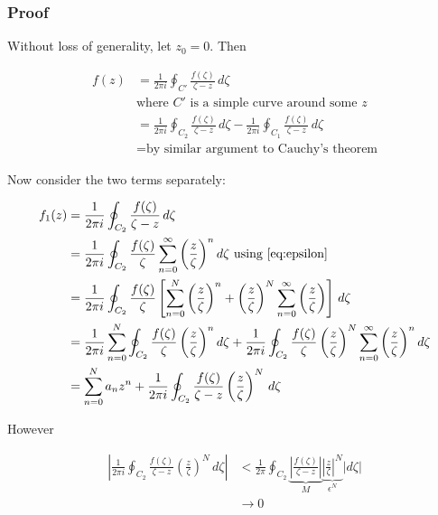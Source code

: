 \documentclass{../../physics_notes}
\begin{document}
\subsubsection*{Proof}

Without loss of generality, let $z_0 = 0$. Then

\begin{align*}
f(z) &= \frac{1}{2\pi i} \oint_{C'} \frac{f(\zeta)}{\zeta - z}\, d\zeta \\
&\text{where $C'$ is a simple curve around some $z$} \\
&= \frac{1}{2\pi i} \oint_{C_2} \frac{f(\zeta)}{\zeta - z}\, d\zeta - \frac{1}{2\pi i} \oint_{C_1} \frac{f(\zeta)}{\zeta - z}\, d\zeta \\
&=\text{by similar argument to Cauchy's theorem}
\end{align*}

Now consider the two terms separately:

\begin{align*}
f_1 (z) &= \frac{1}{2\pi i} \oint_{C_2} \frac{f(\zeta)}{\zeta - z}\, d\zeta \\
&= \frac{1}{2\pi i} \oint_{C_2} \frac{f(\zeta)}{\zeta} \sum_{n=0}^\infty \left(\frac{z}{\zeta}\right)^n d\zeta \text{ using \ref{eq:epsilon}}\\
&= \frac{1}{2\pi i} \oint_{C_2} \frac{f(\zeta)}{\zeta} \left[ \sum_{n=0}^N \left(\frac{z}{\zeta}\right)^n + \left(\frac{z}{\zeta}\right)^N \sum_{n=0}^\infty \left(\frac{z}{\zeta}\right) \right] \, d\zeta \\
&= \frac{1}{2\pi i }\sum_{n=0}^N \oint_{C_2} \frac{f(\zeta)}{\zeta} \left(\frac{z}{\zeta}\right)^n d\zeta + \frac{1}{2\pi i}\oint_{C_2} \frac{f(\zeta)}{\zeta} \left(\frac{z}{\zeta}\right)^N \sum_{n=0}^\infty \left(\frac{z}{\zeta}\right)^n d\zeta \\
&= \sum_{n=0}^N a_n z^n + \frac{1}{2\pi i} \oint_{C_2} \frac{f(\zeta)}{\zeta - z} \left(\frac{z}{\zeta}\right)^N \, d\zeta
\end{align*}

However

\begin{align*} 
\left|\frac{1}{2\pi i} \oint_{C_2} \frac{f(\zeta)}{\zeta - z} \left(\frac{z}{\zeta}\right)^N \, d\zeta \right| &< \frac{1}{2\pi} \oint_{C_2} \underbrace{\left|\frac{f(\zeta)}{\zeta - z}\right|}_{M} \underbrace{\left|\frac{z}{\zeta}\right|^N}_{\epsilon^N} \left|d\zeta\right| \\
&\to 0
\end{align*}
\end{document}

